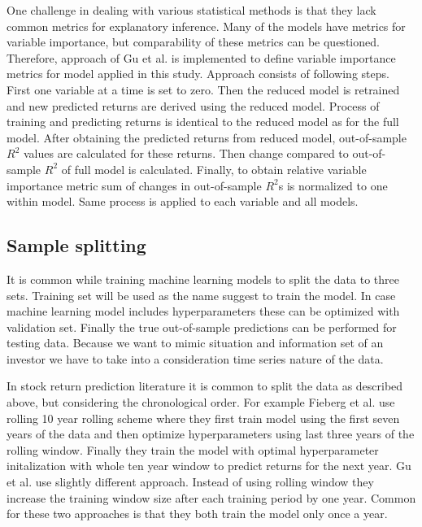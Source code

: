 \documentclass{article}
\begin{document}
One challenge in dealing with various statistical methods is that they lack common metrics for explanatory inference. Many of the models have metrics for variable importance, but comparability of these metrics can be questioned. Therefore, approach of Gu et al. \citeyear{guetal} is implemented to define variable importance metrics for model applied in this study. Approach consists of following steps. First one variable at a time is set to zero. Then the reduced model is retrained and new predicted returns are derived using the reduced model. Process of training and predicting returns is identical to the reduced model as for the full model. After obtaining the predicted returns from reduced model, out-of-sample $R^2$ values are calculated for these returns. Then change compared to out-of-sample $R^2$ of full model is calculated. Finally, to obtain relative variable importance metric sum of changes in out-of-sample $R^2$s is normalized to one within model. Same process is applied to each variable and all models. \par

\subsection{Sample splitting} \label{SampleSplitting}

It is common while training machine learning models to split the data to three sets. Training set will be used as the name suggest to train the model. In case machine learning model includes hyperparameters these can be optimized with validation set. Finally the true out-of-sample predictions can be performed for testing data. Because we want to mimic situation and information set of an investor we have to take into a consideration time series nature of the data. \par

In stock return prediction literature it is common to split the data as described above, but considering the chronological order. For example Fieberg et al. \citeyear{Fieberg} use rolling 10 year rolling scheme where they first train model using the first seven years of the data and then optimize hyperparameters using last three years of the rolling window. Finally they train the model with optimal hyperparameter initalization with whole ten year window to predict returns for the next year. Gu et al. \citeyear{guetal} use slightly different approach. Instead of using rolling window they increase the training window size after each training period by one year. Common for these two approaches is that they both train the model only once a year. \par
\end{document}
